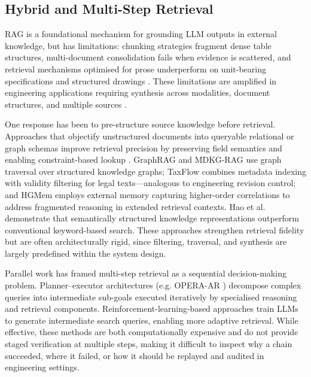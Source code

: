 \documentclass[largeformat]{interact}
\begin{document}
\subsection{Hybrid and Multi-Step Retrieval}
\label{sec:hybrid_multistep_retrieval}
RAG \cite{lewis2020rag} is a foundational mechanism for grounding LLM outputs in external knowledge, but has limitations: chunking strategies fragment dense table structures, multi-document consolidation fails when evidence is scattered, and retrieval mechanisms optimised for prose underperform on unit-bearing specifications and structured drawings \cite{barnett2024seven}. These limitations are amplified in engineering
applications requiring synthesis across modalities, document structures, and multiple sources \cite{gao2023retrieval, xie2026agentframework}.

One response has been to pre-structure source knowledge before retrieval. Approaches that objectify unstructured documents into queryable relational or
graph schemas improve retrieval precision by preserving field semantics and enabling constraint-based lookup \cite{aster2024langchainsql}. GraphRAG
\cite{mondal2025} and MDKG-RAG \cite{zhang2025} use graph traversal over structured knowledge graphs; TaxFlow \cite{Karna31122026} combines metadata
indexing with validity filtering for legal texts---analogous to engineering revision control; and HGMem \cite{zhou2026} employs external memory capturing
higher-order correlations to address fragmented reasoning in extended retrieval contexts. Hao et al.~\cite{hao2021} demonstrate that semantically structured
knowledge representations outperform conventional keyword-based search. These approaches strengthen retrieval fidelity but are often architecturally rigid,
since filtering, traversal, and synthesis are largely predefined within the system design.

Parallel work has framed multi-step retrieval as a sequential decision-making problem. Planner--executor architectures (e.g. OPERA-AR \cite{Liu2025OPERAAR}) decompose complex queries into intermediate sub-goals executed iteratively by specialised reasoning and retrieval components. Reinforcement-learning-based approaches \cite{Song2025R1SearcherIT, jin2025searchr, zhang2024beam, sorokin2026qrag} train LLMs to generate intermediate search queries, enabling more adaptive retrieval. While effective, these methods are both computationally expensive and do not provide staged verification at multiple steps, making it difficult to inspect why a chain succeeded, where it failed, or how it should be replayed and audited in engineering settings.
\end{document}
